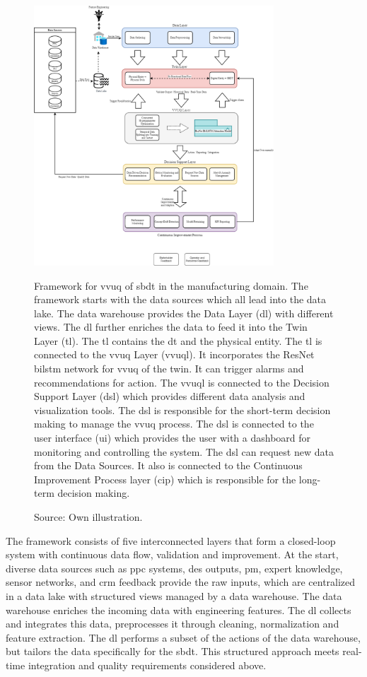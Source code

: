 \begin{figure}[htbp]
  \centering
  \includegraphics[width=0.8\textwidth]{figures/framework.png}
  \caption[The thesis VVUQ framework]{Framework for \gls{vvuq} of \gls{sbdt} in the manufacturing domain. The framework starts with the data sources which all lead into the data lake. The data warehouse provides the Data Layer (\gls{dl}) with different views. The \gls{dl} further enriches the data to feed it into the Twin Layer (\gls{tl}). The \gls{tl} contains the \gls{dt} and the physical entity. The \gls{tl} is connected to the \gls{vvuq} Layer (\gls{vvuql}). It incorporates the ResNet \gls{bilstm} network for \gls{vvuq} of the twin. It can trigger alarms and recommendations for action. The \gls{vvuql} is connected to the Decision Support Layer (\gls{dsl}) which provides different data analysis and visualization tools. The \gls{dsl} is responsible for the short-term decision making to manage the \gls{vvuq} process. The \gls{dsl} is connected to the user interface (\gls{ui}) which provides the user with a dashboard for monitoring and controlling the system. The \gls{dsl} can request new data from the Data Sources. It also is connected to the Continuous Improvement Process layer (\gls{cip}) which is responsible for the long-term decision making.}
  \caption*{Source: Own illustration.}
  \label{fig:framework}
\end{figure}

The framework consists of five interconnected layers that form a closed-loop system with continuous data flow, validation and improvement. At the start, diverse data sources such as \gls{ppc} systems, \gls{des} outputs, \gls{pm}, expert knowledge, sensor networks, and \gls{crm} feedback provide the raw inputs, which are centralized in a data lake with structured views managed by a data warehouse. The data warehouse enriches the incoming data with engineering features. The \gls{dl} collects and integrates this data, preprocesses it through cleaning, normalization and feature extraction. The \gls{dl} performs a subset of the actions of the data warehouse, but tailors the data specifically for the \gls{sbdt}. This structured approach meets real-time integration and quality requirements considered above.

